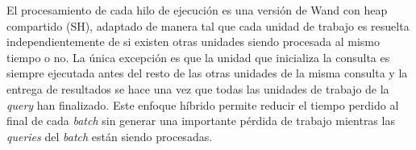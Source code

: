 El procesamiento de cada hilo de ejecución es una versión de Wand con heap compartido (SH), adaptado de manera tal que cada unidad de trabajo es resuelta independientemente de si existen otras unidades siendo procesada al mismo tiempo o no. La única excepción es que la unidad que inicializa la consulta es siempre ejecutada antes del resto de las otras unidades de la misma consulta y la entrega de resultados se hace una vez que todas las unidades de trabajo de la \textit{query} han finalizado. Este enfoque híbrido permite reducir el tiempo perdido al final de cada \textit{batch} sin generar una importante pérdida de trabajo mientras las \textit{queries} del \textit{batch} están siendo procesadas.
